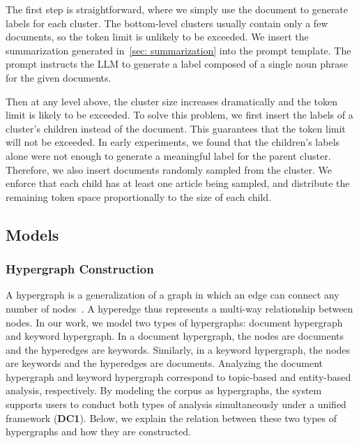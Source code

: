 The first step is straightforward, where we simply use the document to generate labels for each cluster.
The bottom-level clusters usually contain only a few documents, so the token limit is unlikely to be exceeded.
We insert the summarization generated in~\autoref{sec: summarization} into the prompt template.
The prompt instructs the LLM to generate a label composed of a single noun phrase for the given documents.

Then at any level above, the cluster size increases dramatically and the token limit is likely to be exceeded.
To solve this problem, we first insert the labels of a cluster's children instead of the document.
This guarantees that the token limit will not be exceeded.
In early experiments, we found that the children's labels alone were not enough to generate a meaningful label for the parent cluster.
Therefore, we also insert documents randomly sampled from the cluster.
We enforce that each child has at least one article being sampled, and distribute the remaining token space proportionally to the size of each child.

\subsection{Models}
\subsubsection{Hypergraph Construction}
A hypergraph is a generalization of a graph in which an edge can connect any number of nodes~\cite{fischer2021hypergraphsurvey}.
A hyperedge thus represents a multi-way relationship between nodes.
In our work, we model two types of hypergraphs: document hypergraph and keyword hypergraph.
In a document hypergraph, the nodes are documents and the hyperedges are keywords.
Similarly, in a keyword hypergraph, the nodes are keywords and the hyperedges are documents.
Analyzing the document hypergraph and keyword hypergraph correspond to topic-based and entity-based analysis, respectively.
By modeling the corpus as hypergraphs, the system supports users to conduct both types of analysis simultaneously under a unified framework (\textbf{DC1}).
Below, we explain the relation between these two types of hypergraphs and how they are constructed.

